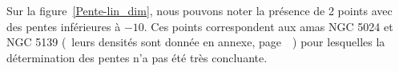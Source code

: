 	Sur la figure~\ref{Pente-lin_dim}, nous pouvons noter la présence de 2 points avec des pentes inférieures à $-10$. Ces points correspondent aux amas NGC 5024 et NGC 5139
	(~leurs densités sont donnée en annexe, page~\pageref{Graphe-bofbof}~) pour lesquelles la détermination des pentes n'a pas été très concluante.
	\FloatBarrier





